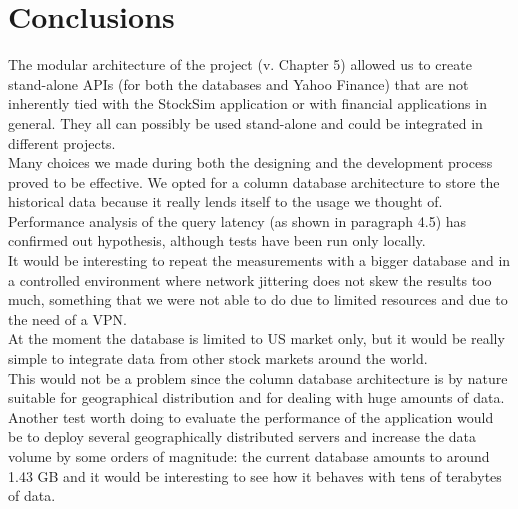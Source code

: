 \chapter{Conclusions}
The modular architecture of the project (v. Chapter 5) allowed us to create stand-alone APIs (for both the databases and Yahoo Finance) that are not inherently tied with the StockSim application or with financial applications in general. They all can possibly be used stand-alone and could be integrated in different projects.\\

Many choices we made during both the designing and the development process proved to be effective.
We opted for a column database architecture to store the historical data because it really lends itself to the usage we thought of. Performance analysis of the query latency (as shown in paragraph 4.5) has confirmed out hypothesis, although tests have been run only locally.\\It would be interesting to repeat the measurements with a bigger database and in a controlled environment where network jittering does not skew the results too much, something that we were not able to do due to limited resources and due to the need of a VPN.\\

At the moment the database is limited to US market only, but it would be really simple to integrate data from other stock markets around the world.\\
This would not be a problem since the column database architecture is by nature suitable for geographical distribution and for dealing with huge amounts of data. Another test worth doing to evaluate the performance of the application would be to deploy several geographically distributed servers and increase the data volume by some orders of magnitude: the current database amounts to around 1.43 GB and it would be interesting to see how it behaves with tens of terabytes of data.

\afterpage{\blankpage}
